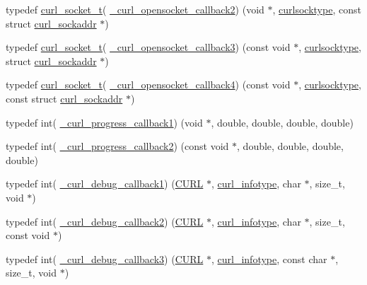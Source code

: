\begin{DoxyCompactItemize}
\item 
typedef \hyperlink{curl_8h_adb5a46d02359d2379dc7e0904c987828}{curl\+\_\+socket\+\_\+t}( \hyperlink{typecheck-gcc_8h_a94ad8a966561cb2d8182d913924ea3d4}{\+\_\+curl\+\_\+opensocket\+\_\+callback2}) (void $\ast$, \hyperlink{curl_8h_ae319cab849319fca1b222de282506ad9}{curlsocktype}, const struct \hyperlink{structcurl__sockaddr}{curl\+\_\+sockaddr} $\ast$)
\item 
typedef \hyperlink{curl_8h_adb5a46d02359d2379dc7e0904c987828}{curl\+\_\+socket\+\_\+t}( \hyperlink{typecheck-gcc_8h_a41d3335c85e3e2708a787de313b41735}{\+\_\+curl\+\_\+opensocket\+\_\+callback3}) (const void $\ast$, \hyperlink{curl_8h_ae319cab849319fca1b222de282506ad9}{curlsocktype}, struct \hyperlink{structcurl__sockaddr}{curl\+\_\+sockaddr} $\ast$)
\item 
typedef \hyperlink{curl_8h_adb5a46d02359d2379dc7e0904c987828}{curl\+\_\+socket\+\_\+t}( \hyperlink{typecheck-gcc_8h_ac996e9ffa7bb261a4589ce066ac69bb9}{\+\_\+curl\+\_\+opensocket\+\_\+callback4}) (const void $\ast$, \hyperlink{curl_8h_ae319cab849319fca1b222de282506ad9}{curlsocktype}, const struct \hyperlink{structcurl__sockaddr}{curl\+\_\+sockaddr} $\ast$)
\item 
typedef int( \hyperlink{typecheck-gcc_8h_a4a19f089bb72a78916e0c8f6d3eabb43}{\+\_\+curl\+\_\+progress\+\_\+callback1}) (void $\ast$, double, double, double, double)
\item 
typedef int( \hyperlink{typecheck-gcc_8h_a07f7e31041e7c89dd37e0abaa886eda1}{\+\_\+curl\+\_\+progress\+\_\+callback2}) (const void $\ast$, double, double, double, double)
\item 
typedef int( \hyperlink{typecheck-gcc_8h_a7df204c26605e377eb51af8159aaa6aa}{\+\_\+curl\+\_\+debug\+\_\+callback1}) (\hyperlink{curl_8h_ace655e3633b6533591283994d6b5cdda}{C\+U\+RL} $\ast$, \hyperlink{curl_8h_a9704d2633927f77efaa3e3c6f1c23a14}{curl\+\_\+infotype}, char $\ast$, size\+\_\+t, void $\ast$)
\item 
typedef int( \hyperlink{typecheck-gcc_8h_abff1bf0f556f56841d7ee494e28488a4}{\+\_\+curl\+\_\+debug\+\_\+callback2}) (\hyperlink{curl_8h_ace655e3633b6533591283994d6b5cdda}{C\+U\+RL} $\ast$, \hyperlink{curl_8h_a9704d2633927f77efaa3e3c6f1c23a14}{curl\+\_\+infotype}, char $\ast$, size\+\_\+t, const void $\ast$)
\item 
typedef int( \hyperlink{typecheck-gcc_8h_a6b69c0e254e465fbaf746b1ef7067914}{\+\_\+curl\+\_\+debug\+\_\+callback3}) (\hyperlink{curl_8h_ace655e3633b6533591283994d6b5cdda}{C\+U\+RL} $\ast$, \hyperlink{curl_8h_a9704d2633927f77efaa3e3c6f1c23a14}{curl\+\_\+infotype}, const char $\ast$, size\+\_\+t, void $\ast$)

\end{DoxyCompactItemize}
